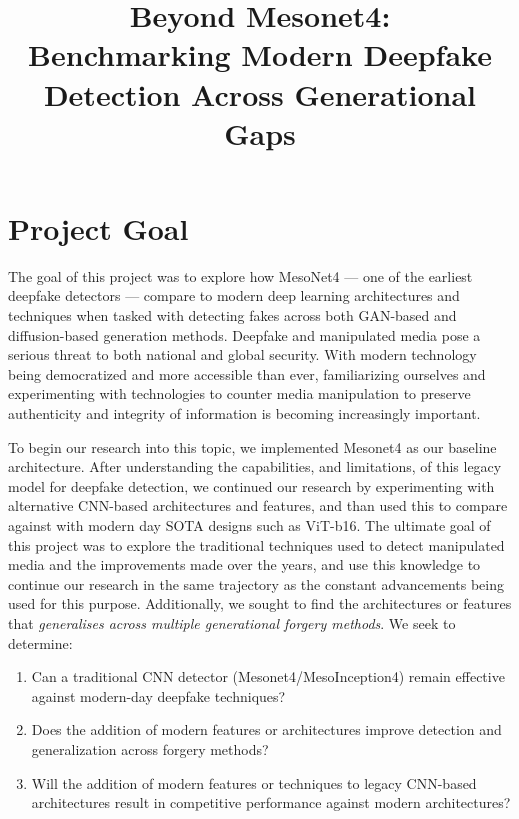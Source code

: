 \documentclass[conference]{IEEEtran}
\begin{document}
\title{Beyond Mesonet4:\\
Benchmarking Modern Deepfake Detection Across Generational Gaps}

\author{
}

\maketitle

\section{Project Goal}
\label{sec:goal}

The goal of this project was to explore how MesoNet4 — one of the earliest deepfake detectors
— compare to modern deep learning architectures and techniques
when tasked with detecting fakes across both GAN-based and
diffusion-based generation methods. Deepfake and manipulated media pose a serious threat to both national and global security. With modern technology being democratized and more accessible than ever, familiarizing ourselves and experimenting with technologies to counter media manipulation to preserve authenticity and integrity of information is becoming increasingly important. 

To begin our research into this topic, we implemented Mesonet4 as our baseline architecture. After understanding the capabilities, and limitations, of this legacy model for deepfake detection, we continued our research by experimenting with alternative CNN-based architectures and features, and than used this to compare against with modern day SOTA designs such as ViT-b16. The ultimate goal of this project was to explore the traditional techniques used to detect manipulated media and the improvements made over the years, and use this knowledge to continue our research in the same trajectory as the constant advancements being used for this purpose. Additionally, we sought to find the architectures or features that \emph{generalises across multiple generational forgery methods}. We seek to determine:
\begin{enumerate}
  \item Can a traditional CNN detector (Mesonet4/MesoInception4) remain effective against modern-day deepfake techniques?
  \item Does the addition of modern features or architectures improve detection and generalization across forgery methods?
  \item Will the addition of modern features or techniques to legacy CNN-based architectures result in competitive performance against modern architectures?
\end{enumerate}
\end{document}
